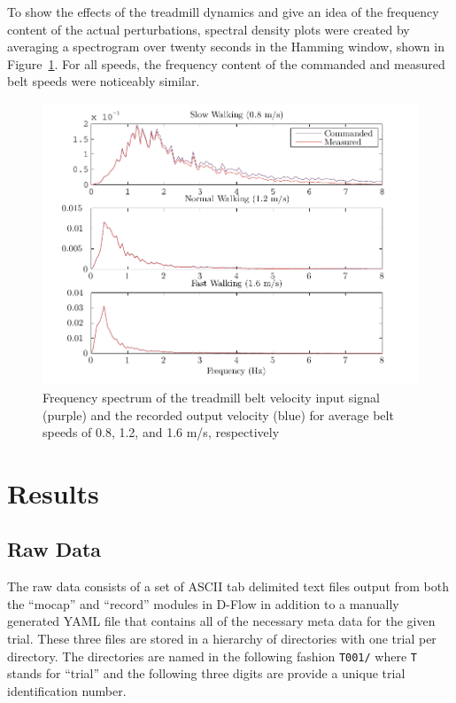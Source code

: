 \documentclass[fleqn,12pt]{wlpeerj}
\begin{document}
To show the effects of the treadmill dynamics and give an idea of the frequency
content of the actual perturbations, spectral density plots were created 
by averaging a spectrogram over twenty seconds in the Hamming window, shown 
in Figure~\ref{fig:freq_analysis}. For all speeds, the frequency content of the
commanded and measured belt speeds were noticeably similar.  
%
\begin{figure}
  \centering
  \includegraphics{figures/frequency_analysis.pdf}
  \caption{Frequency spectrum of the treadmill belt velocity input signal
    (purple) and the recorded output velocity (blue) for average belt speeds of
    0.8, 1.2, and 1.6 m/s, respectively}
  \label{fig:freq_analysis}
\end{figure}
\section*{Results}
\subsection*{Raw Data}
%
The raw data consists of a set of ASCII tab delimited text files output from
both the ``mocap'' and ``record'' modules in D-Flow in addition to a manually
generated YAML file that contains all of the necessary meta data for the given
trial. These three files are stored in a hierarchy of directories with one
trial per directory. The directories are named in the following fashion
\verb+T001/+ where \verb+T+ stands for ``trial'' and the following three digits
are provide a unique trial identification number.
\end{document}
